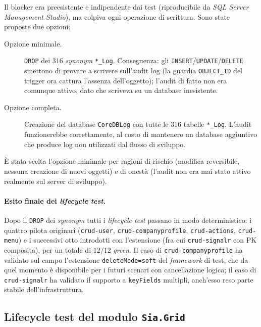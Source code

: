 Il blocker era preesistente e indipendente dai test (riproducibile da \emph{SQL Server Management Studio}), ma colpiva ogni operazione di scrittura. Sono state proposte due opzioni:
\begin{description}
    \item[Opzione minimale.] \texttt{DROP} dei $316$ \emph{synonym} \texttt{*\_Log}. Conseguenza: gli \texttt{INSERT}/\texttt{UPDATE}/\texttt{DELETE} smettono di provare a scrivere sull'audit log (la guardia \texttt{OBJECT\_ID} del trigger ora cattura l'assenza dell'oggetto); l'audit di fatto non era comunque attivo, dato che scriveva su un database inesistente.
    \item[Opzione completa.] Creazione del database \texttt{CoreDBLog} con tutte le $316$ tabelle \texttt{*\_Log}. L'audit funzionerebbe correttamente, al costo di mantenere un database aggiuntivo che produce log non utilizzati dal flusso di sviluppo.
\end{description}

È stata scelta l'opzione minimale per ragioni di rischio (modifica reversibile, nessuna creazione di nuovi oggetti) e di onestà (l'audit non era mai stato attivo realmente sul server di sviluppo).

\paragraph{Esito finale dei \emph{lifecycle test}.} Dopo il \texttt{DROP} dei \emph{synonym} tutti i \emph{lifecycle test} passano in modo deterministico: i quattro pilota originari (\texttt{crud-user}, \texttt{crud-companyprofile}, \texttt{crud-actions}, \texttt{crud-menu}) e i successivi otto introdotti con l'estensione (fra cui \texttt{crud-signalr} con PK composita), per un totale di $12/12$ \emph{green}. Il caso di \texttt{crud-companyprofile} ha validato sul campo l'estensione \texttt{deleteMode=soft} del \emph{framework} di test, che da quel momento è disponibile per i futuri scenari con cancellazione logica; il caso di \texttt{crud-signalr} ha validato il supporto a \texttt{keyFields} multipli, anch'esso reso parte stabile dell'infrastruttura.

\subsection{Lifecycle test del modulo \texttt{Sia.Grid}}

